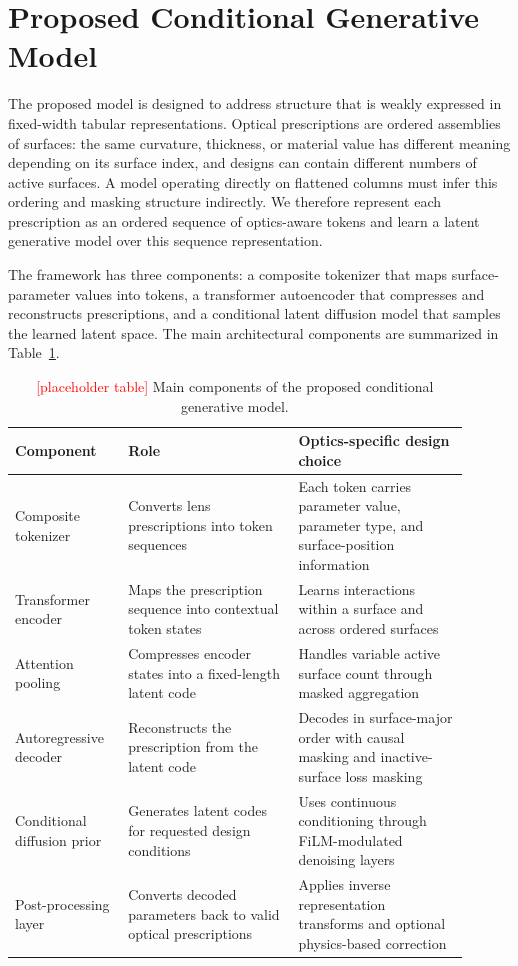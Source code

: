 \section{Proposed Conditional Generative Model}

The proposed model is designed to address structure that is weakly expressed in fixed-width tabular representations. Optical prescriptions are ordered assemblies of surfaces: the same curvature, thickness, or material value has different meaning depending on its surface index, and designs can contain different numbers of active surfaces. A model operating directly on flattened columns must infer this ordering and masking structure indirectly. We therefore represent each prescription as an ordered sequence of optics-aware tokens and learn a latent generative model over this sequence representation.

The framework has three components: a composite tokenizer that maps surface-parameter values into tokens, a transformer autoencoder that compresses and reconstructs prescriptions, and a conditional latent diffusion model that samples the learned latent space. The main architectural components are summarized in Table~\ref{tab:conditional_model_components}.

\begin{table}[ht]
\centering
\footnotesize
\setlength{\tabcolsep}{4pt}
\caption{\textcolor{red}{[placeholder table]} Main components of the proposed conditional generative model.}
\label{tab:conditional_model_components}
\begin{tabular}{p{0.22\linewidth}p{0.34\linewidth}p{0.34\linewidth}}
\toprule
\textbf{Component} & \textbf{Role} & \textbf{Optics-specific design choice} \\
\midrule
Composite tokenizer & Converts lens prescriptions into token sequences & Each token carries parameter value, parameter type, and surface-position information \\
Transformer encoder & Maps the prescription sequence into contextual token states & Learns interactions within a surface and across ordered surfaces \\
Attention pooling & Compresses encoder states into a fixed-length latent code & Handles variable active surface count through masked aggregation \\
Autoregressive decoder & Reconstructs the prescription from the latent code & Decodes in surface-major order with causal masking and inactive-surface loss masking \\
Conditional diffusion prior & Generates latent codes for requested design conditions & Uses continuous conditioning through FiLM-modulated denoising layers \\
Post-processing layer & Converts decoded parameters back to valid optical prescriptions & Applies inverse representation transforms and optional physics-based correction \\
\bottomrule
\end{tabular}
\end{table}

